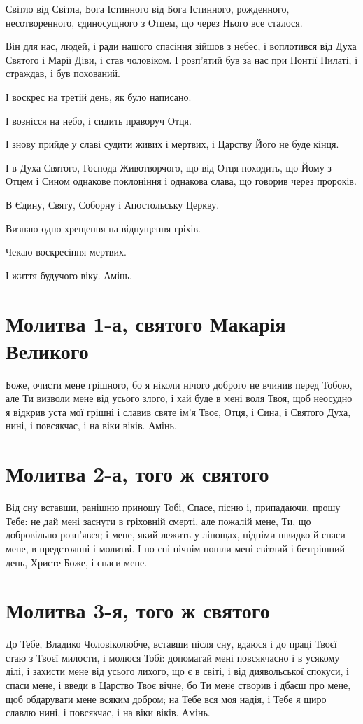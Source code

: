 \documentclass[chapters.tex]{subfiles}
\begin{document}
Світло від Світла, Бога Істинного від Бога Істинного, рожденного, несотворенного, єдиносущного з Отцем, що через Нього все сталося.

Він для нас, людей, і ради нашого спасіння зійшов з небес, і воплотився від Духа Святого і Марії Діви, і став чоловіком. І розп’ятий був за нас при Понтії Пилаті, і страждав, і був похований.

І воскрес на третій день, як було написано.

І вознісся на небо, і сидить праворуч Отця.

І знову прийде у славі судити живих і мертвих, і Царству Його не буде кінця.

І в Духа Святого, Господа Животворчого, що від Отця походить, що Йому з Отцем і Сином однакове поклоніння і однакова слава, що говорив через пророків.

В Єдину, Святу, Соборну і Апостольську Церкву.

Визнаю одно хрещення на відпущення гріхів.

Чекаю воскресіння мертвих.

І життя будучого віку. Амінь.

\section{Молитва 1-а, святого Макарія Великого}
Боже, очисти мене грішного, бо я ніколи нічого доброго не вчинив перед Тобою, але Ти визволи мене від усього злого, і хай буде в мені воля Твоя, щоб неосудно я відкрив уста мої грішні і славив святе ім’я Твоє, Отця, і Сина, і Святого Духа, нині, і повсякчас, і на віки віків. Амінь.

\section{Молитва 2-а, того ж святого}
Від сну вставши, ранішню приношу Тобі, Спасе, пісню і, припадаючи, прошу Тебе: не дай мені заснути в гріховній смерті, але пожалій мене, Ти, що добровільно розп’явся; і мене, який лежить у лінощах, підніми швидко й спаси мене, в предстоянні і молитві. І по сні нічнім пошли мені світлий і безгрішний день, Христе Боже, і спаси мене.

\section{Молитва 3-я, того ж святого}
До Тебе, Владико Чоловіколюбче, вставши після сну, вдаюся і до праці Твоєї стаю з Твоєї милости, і молюся Тобі: допомагай мені повсякчасно і в усякому ділі, і захисти мене від усього лихого, що є в світі, і від диявольської спокуси, і спаси мене, і введи в Царство Твоє вічне, бо Ти мене створив і дбаєш про мене, щоб обдарувати мене всяким добром; на Тебе вся моя надія, і Тебе я щиро славлю нині, і повсякчас, і на віки віків. Амінь.
\end{document}
